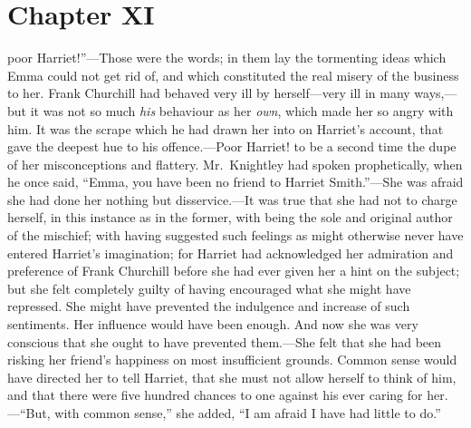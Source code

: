 \chapter{Chapter XI}


 poor Harriet!''---Those were the words; in them lay the
tormenting ideas which Emma could not get rid of, and which constituted
the real misery of the business to her.  Frank Churchill had behaved
very ill by herself---very ill in many ways,---but it was not so much
\emph{his} behaviour as her \emph{own}, which made her so angry with him.
It was the scrape which he had drawn her into on Harriet's account,
that gave the deepest hue to his offence.---Poor Harriet! to be a second
time the dupe of her misconceptions and flattery.  Mr.\ Knightley
had spoken prophetically, when he once said, ``Emma, you have been
no friend to Harriet Smith.''---She was afraid she had done her nothing
but disservice.---It was true that she had not to charge herself,
in this instance as in the former, with being the sole and original
author of the mischief; with having suggested such feelings as might
otherwise never have entered Harriet's imagination; for Harriet
had acknowledged her admiration and preference of Frank Churchill
before she had ever given her a hint on the subject; but she felt
completely guilty of having encouraged what she might have repressed.
She might have prevented the indulgence and increase of such sentiments.
Her influence would have been enough.  And now she was very conscious
that she ought to have prevented them.---She felt that she had been
risking her friend's happiness on most insufficient grounds.
Common sense would have directed her to tell Harriet, that she
must not allow herself to think of him, and that there were five
hundred chances to one against his ever caring for her.---``But, with
common sense,'' she added, ``I am afraid I have had little to do.''

